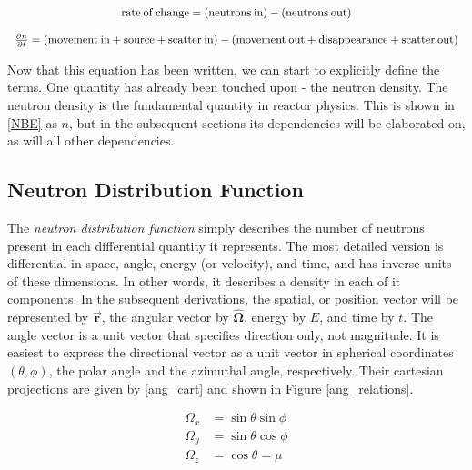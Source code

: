 \begin{equation}
\footnotesize
\label{NBE}
\begin{array}{c}
\mathrm{rate\:of\:change} = (\mathrm{neutrons\:in}) - (\mathrm{neutrons\:out}) \\
\\
\frac{\partial n}{\partial t} = ( \mathrm{movement\:in} + \mathrm{source} + \mathrm{scatter\:in}) - ( \mathrm{movement\:out} + \mathrm{disappearance} + \mathrm{scatter\:out})
\end{array}
\end{equation}

Now that this equation has been written, we can start to explicitly define the terms.  One quantity has already been touched upon - the neutron density.  The neutron density is the fundamental quantity in reactor physics.  This is shown in \eqref{NBE} as $n$, but in the subsequent sections its dependencies will be elaborated on, as will all other dependencies.


\subsection{Neutron Distribution Function}

The \emph{neutron distribution function} simply describes the number of neutrons present in each differential quantity it represents.  The most detailed version is differential in space, angle, energy (or velocity), and time, and has inverse units of these dimensions.  In other words, it describes a density in each of it components.  In the subsequent derivations, the spatial, or position vector will be represented by $\boldsymbol{\vec{r}}$, the angular vector by $\boldsymbol{\hat{\Omega}}$, energy by $E$, and time by $t$.  The angle vector is a unit vector that specifies direction only, not magnitude.  It is easiest to express the directional vector as a unit vector in spherical coordinates $(\theta, \phi)$, the polar angle and the azimuthal angle, respectively.  Their cartesian projections are given by \eqref{ang_cart} and shown in Figure \ref{ang_relations}.

\begin{equation}
\label{ang_cart}
\begin{split}
\Omega_x &= \sin \theta \sin \phi  \\
\Omega_y &= \sin \theta \cos \phi \\
\Omega_z &= \cos \theta = \mu
\end{split}
\end{equation}

